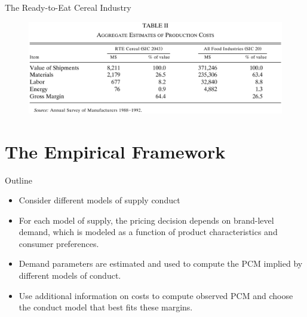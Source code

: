 \documentclass{beamer}
\begin{document}
\begin{frame}{The Ready-to-Eat Cereal Industry}
	\begin{figure}[h]
		\centering
		\includegraphics[scale=0.2]{table2.png}
	\end{figure}
\end{frame}

\section{The Empirical Framework}
\begin{frame}
	\transfade
	\tableofcontents[sectionstyle=show/shaded,subsectionstyle=show/shaded/hide]
	\addtocounter{framenumber}{-1}
\end{frame}
\begin{frame}{Outline}
	\begin{itemize}
		\item Consider different models of supply conduct
		\item For each model of supply, the pricing decision depends on brand-level demand, which is modeled as a function of product characteristics and consumer preferences.
		\item Demand parameters are estimated and used to compute the PCM implied by different models of conduct.
		\item Use additional information on costs to compute observed PCM and choose the conduct model that best fits these margins.
	\end{itemize}
\end{frame}
\end{document}
